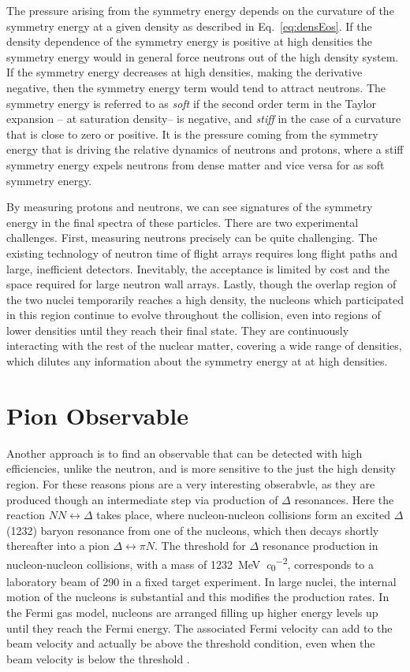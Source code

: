 The pressure arising from the symmetry energy depends on the curvature of the symmetry energy at a given density as described in Eq.~\ref{eq:densEos}. If the density dependence of the symmetry energy is positive at high densities the symmetry energy would in general force neutrons out of the high density system. If the symmetry energy decreases at high densities, making the derivative  negative, then the symmetry energy term would tend to attract neutrons. The symmetry energy is referred to as \emph{soft} if the second order term in the Taylor expansion -- at saturation density-- is negative, and \emph{stiff} in the case of a curvature that is close to zero or positive. It is the pressure coming from the symmetry energy that is driving the relative dynamics of neutrons and protons, where a stiff symmetry energy expels neutrons from dense matter and vice versa for as soft symmetry energy.

By measuring protons and neutrons, we can see signatures of the symmetry energy in the final spectra of these particles. There are two experimental challenges. First,  measuring neutrons precisely can be quite challenging. The existing technology of neutron time of flight arrays requires long flight paths and large, inefficient detectors. Inevitably, the acceptance is limited by cost and the space required for large neutron wall arrays. Lastly, though the overlap region of the two nuclei temporarily reaches a high density, the nucleons which participated in this region continue to evolve throughout the collision, even into regions of lower densities until they reach their final state. They are continuously interacting with the rest of the nuclear matter, covering a wide range of densities, which dilutes any information about the symmetry energy at at high densities.  




\section{Pion Observable}
\label{sec:pionObs}
Another approach is to find an observable that can be detected with high efficiencies, unlike the neutron, and is more sensitive to the just the high density region. For these reasons pions are a very interesting obserabvle, as they are produced though an intermediate step via production of $\Delta$ resonances. Here the reaction $ NN \leftrightarrow \Delta$ takes place, where nucleon-nucleon collisions form an excited $\Delta$(1232) baryon resonance from one of the nucleons, which then decays shortly thereafter into a pion $\Delta \leftrightarrow \pi N$. The threshold for $\Delta$ resonance production in nucleon-nucleon collisions, with a mass of \SI{1232}{\mega\electronvolt\per\clight\squared}, corresponds to a laboratory beam of \SI{290}{\MeVA} in a fixed target experiment. In large nuclei, the internal motion of the nucleons is substantial and this modifies the production rates. In the Fermi gas model, nucleons are arranged filling up higher energy levels up until they reach the Fermi energy. The associated Fermi velocity can add to the beam velocity and actually be above the threshold condition, even when the beam velocity is below the threshold \cite{fermiEnergy}.


